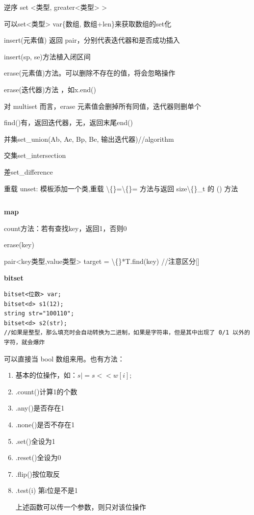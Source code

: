 \documentclass[twocolumn,10pt]{ctexart}
\makeatletter
\newcommand{\hfive}[1]{\par\addvspace{6pt}\@afterindentfalse
  {\noindent\bfseries\normalsize #1}\par\nobreak\vspace{2pt}}
\makeatother
\begin{document}
逆序 set <类型, greater<类型> >

可以set<类型> var\{数组, 数组+len\}来获取数组的set化

insert(元素值) 返回 pair，分别代表迭代器和是否成功插入

insert(sp, se)方法植入闭区间

erase(元素值)方法。可以删除不存在的值，将会忽略操作

erase(迭代器)方法 ，如x.end()

对 multiset 而言，erase 元素值会删掉所有同值，迭代器则删单个

find()有，返回迭代器，无，返回末尾end()

并集set\_union(Ab, Ae, Bp, Be, 输出迭代器)//algorithm

交集set\_intersection

差set\_difference

重载 unset: 模板添加一个类,重载 \textbackslash\{\}=\textbackslash\{\}= 方法与返回 size\textbackslash\{\}\_t 的 () 方法

\inputminted{cpp}{code/unset.cpp}

\hfive{map}

count方法：若有查找key，返回1，否则0

erase(key)

pair<key类型,value类型> target = \textbackslash\{\}*T.find(key)  //注意区分[]

\hfive{bitset}

\begin{verbatim}
bitset<位数> var;
bitset<d> s1(12);
string str="100110";
bitset<d> s2(str);
//如果是整型，那么填充时会自动转换为二进制，如果是字符串，但是其中出现了 0/1 以外的字符，就会爆炸
\end{verbatim}

可以直接当 bool 数组来用。也有方法：

\begin{enumerate}
\item 基本的位操作，如：$s|=s<<w[i];$
\item .count()计算1的个数
\item .any()是否存在1
\item .none()是否不存在1
\item .set()全设为1
\item .reset()全设为0
\item .flip()按位取反
\item .test(i) 第i位是不是1

上述函数可以传一个参数，则只对该位操作
\end{enumerate}
\end{document}
